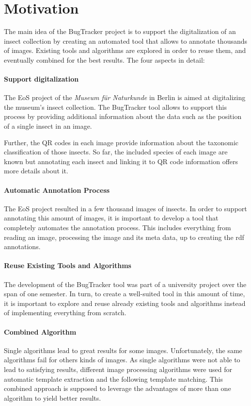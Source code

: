 %
\section{Motivation}
\label{sec_motivation}

The main idea of the BugTracker project is to support the digitalization of an insect collection by creating an automated tool that allows to annotate thousands of images.
Existing tools and algorithms are explored in order to reuse them, and eventually combined for the best results. The four aspects in detail:

\paragraph{Support digitalization}
The EoS project of the \emph{Museum für Naturkunde} in Berlin is aimed at digitalizing the museum's insect collection.
The BugTracker tool allows to support this process by providing additional information about the data such as the position of a single insect in an image.

Further, the QR codes in each image provide information about the taxonomic classification of those insects.
So far, the included species of each image are known but annotating each insect and linking it to QR code information offers more details about it.

\paragraph{Automatic Annotation Process}
The EoS project resulted in a few thousand images of insects.
In order to support annotating this amount of images, it is important to develop a tool that completely automates the annotation process.
This includes everything from reading an image, processing the image and its meta data, up to creating the rdf annotations.

\paragraph{Reuse Existing Tools and Algorithms}
The development of the BugTracker tool was part of a university project over the span of one semester. 
In turn, to create a well-suited tool in this amount of time, it is important to explore and reuse already existing tools and algorithms instead of implementing everything from scratch.

\paragraph{Combined Algorithm}
Single algorithms lead to great results for some images.
Unfortunately, the same algorithms fail for others kinds of images.
As single algorithms were not able to lead to satisfying results, different image processing algorithms were used for automatic template extraction and the following template matching.
This combined approach is supposed to leverage the advantages of more than one algorithm to yield better results.
